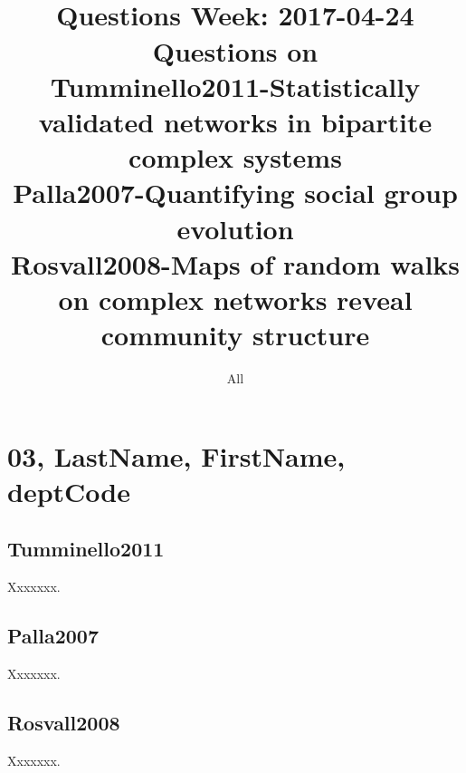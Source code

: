 \documentclass[11pt,a4,twocolumn]{article}
\title{
	{\small 	
		\hbCourse\\
		Questions Week: 2017-04-24\\ 
	}
	Questions on \\
	Tumminello2011-Statistically validated networks in bipartite complex systems\\
	Palla2007-Quantifying social group evolution\\
	Rosvall2008-Maps of random walks on complex networks reveal community structure
}
\author{All}
\date{\hbTimeStamp}
\begin{document}
\maketitle
\setcounter{tocdepth}{1}
\tableofcontents



 
\section{03, LastName, FirstName, deptCode} 



 
\subsection{Tumminello2011}

Xxxxxxx.



 
\subsection{Palla2007}

Xxxxxxx.



 
\subsection{Rosvall2008}

Xxxxxxx.




\end{document}
